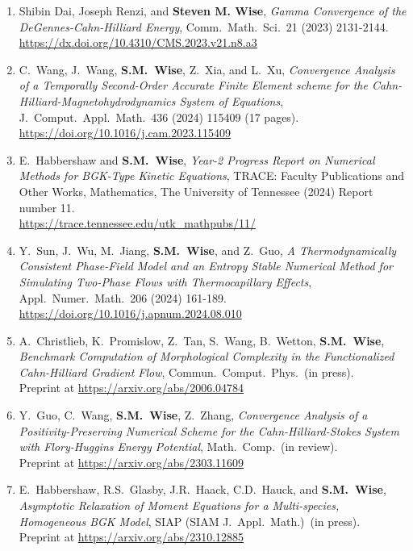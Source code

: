 \documentclass[11pt]{letter}
\begin{document}
\begin{enumerate}
	\item
Shibin Dai, Joseph Renzi, and \textbf{Steven M. Wise}, {\sl Gamma Convergence of the DeGennes-Cahn-Hilliard Energy}, Comm.~Math.~Sci.~21 (2023) 2131-2144. 
	\\
\url{https://dx.doi.org/10.4310/CMS.2023.v21.n8.a3}

	\item
C.~Wang, J.~Wang, \textbf{S.M.~Wise}, Z.~Xia, and L.~Xu, {\sl Convergence Analysis of a Temporally Second-Order Accurate Finite Element scheme for the Cahn-Hilliard-Magnetohydrodynamics System of Equations}, J.~Comput.~Appl.~Math.~436 (2024) 115409 (17 pages).
	\\
\url{https://doi.org/10.1016/j.cam.2023.115409}

	\item
E.~Habbershaw and \textbf{S.M.~Wise}, {\sl Year-2 Progress Report on Numerical Methods for BGK-Type Kinetic Equations}, TRACE: Faculty Publications and Other Works, Mathematics, The University of Tennessee (2024) Report number 11.
 	\\
\url{https://trace.tennessee.edu/utk_mathpubs/11/}

	\item
Y.~Sun, J.~Wu, M.~Jiang, \textbf{S.M.~Wise}, and Z.~Guo, {\sl A Thermodynamically Consistent Phase-Field Model and an Entropy Stable Numerical Method for Simulating Two-Phase Flows with Thermocapillary Effects}, Appl.~Numer.~Math.~206 (2024) 161-189.
	\\
\url{https://doi.org/10.1016/j.apnum.2024.08.010}

	\item
A.~Christlieb, K.~Promislow, Z.~Tan, S.~Wang, B.~Wetton, \textbf{S.M.~Wise}, {\sl Benchmark Computation of Morphological Complexity in the Functionalized Cahn-Hilliard Gradient Flow}, Commun.~Comput.~Phys.~(in press).
	\\ 
Preprint at \url{https://arxiv.org/abs/2006.04784}

	\item
Y.~Guo, C.~Wang, \textbf{S.M.~Wise}, Z.~Zhang, {\sl Convergence Analysis of a Positivity-Preserving Numerical Scheme for the Cahn-Hilliard-Stokes System with Flory-Huggins Energy Potential}, Math.~Comp.~(in review).
	\\
Preprint at \url{https://arxiv.org/abs/2303.11609}

	\item
E.~Habbershaw, R.S.~Glasby, J.R.~Haack, C.D.~Hauck, and \textbf{S.M.~Wise}, {\sl Asymptotic Relaxation of Moment Equations for a Multi-species, Homogeneous BGK Model}, SIAP (SIAM J.~Appl.~Math.)~(in press).
	\\
Preprint at \url{https://arxiv.org/abs/2310.12885}


\end{enumerate}
\end{document}
